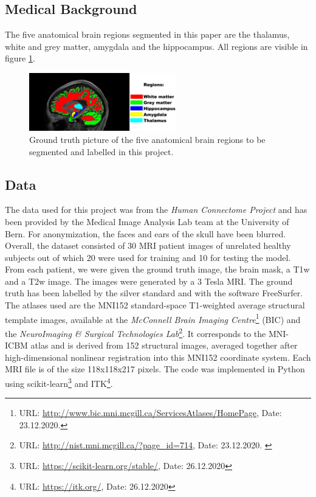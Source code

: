 \documentclass[article]{IEEEtran}
\begin{document}
\subsection{Medical Background}
	The five anatomical brain regions segmented in this paper are the thalamus, white and grey matter, amygdala and the hippocampus. All regions are visible in figure \ref{fig:e1}.

	\begin{figure}[h]
		\centering
		\includegraphics[width=0.57\textwidth]{brainRegions}
		\caption{Ground truth picture of the five anatomical brain regions to be segmented and labelled in this project.}
		\label{fig:e1}
	\end{figure}

\subsection{Data}
	The data used for this project was from the {\itshape Human Connectome Project} and has been provided by the Medical Image Analysis Lab team at the University of Bern. For anonymization, the faces and ears of the skull have been blurred. 
	Overall, the dataset consisted of 30 MRI patient images of unrelated healthy subjects out of which 20 were used for training and 10 for testing the model. 
	From each patient, we were given the ground truth image, the brain mask, a T1w and a T2w image. The images were generated by a 3 Tesla MRI. 
	The ground truth has been labelled by the silver standard and with the software FreeSurfer.
	The atlases used are the MNI152 standard-space T1-weighted average structural template images, available at the {\itshape McConnell Brain Imaging Centre}\footnote{URL: \url{http://www.bic.mni.mcgill.ca/ServicesAtlases/HomePage}, Date: 23.12.2020.} (BIC) and the {\itshape NeuroImaging \& Surgical Technologies Lab}\footnote{URL: \url{http://nist.mni.mcgill.ca/?page_id=714}, Date: 23.12.2020. \label{second}}. 
	It corresponds to the MNI-ICBM atlas and is derived from 152 structural images, averaged together after high-dimensional nonlinear registration into this MNI152 coordinate system.
	Each MRI file is of the size 118x118x217 pixels.\smallskip
	The code was implemented in Python using scikit-learn\footnote{URL: \url{https://scikit-learn.org/stable/}, Date: 26.12.2020} and ITK\footnote{URL: \url{https://itk.org/}, Date: 26.12.2020}.
		
\end{document}
